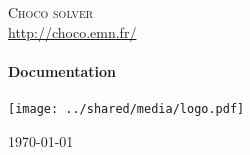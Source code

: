 \begin{titlepage}
\begin{center}
\textsc{\LARGE Choco solver}\\
\url{http://choco.emn.fr/}\\[1.5cm]

\HRule \\[0.4cm]
{ \Huge \bfseries Documentation}\\
\HRule \\[1cm]
\texttt{[image: ../shared/media/logo.pdf]} 

\vfill
{\large \today}
\end{center}
\end{titlepage}

\clearpage

